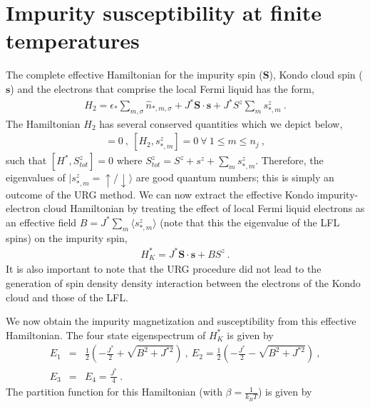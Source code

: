 \documentclass[aps,prb,preprint,groupedaddress]{revtex4-2}
\begin{document}
\section{Impurity susceptibility at finite temperatures}\label{susc1}
The complete effective Hamiltonian for the impurity spin ($\mathbf{S}$), Kondo cloud spin ($\mathbf{s}$) and the electrons that comprise the local Fermi liquid has the form,
\begin{eqnarray}
H_{2}=\epsilon_{*}\sum_{m,\sigma}\hat{n}_{*,m,\sigma}+J^{*}\mathbf{S}\cdot\mathbf{s}+J^{*}S^{z}\sum_{m}s^{z}_{*,m}~.
\label{kondototham}
\end{eqnarray}
The Hamiltonian $H_{2}$ has several conserved quantities which we depict below,
\begin{eqnarray}
[H_{2},S^{z}+s^{z}]=0~,~ [H_{2},s^{z}_{*,m}]=0 ~\forall ~1\leq m\leq n_{j}~,
\end{eqnarray}
such that $[H^{*},S^{z}_{tot}]=0$ where $S^{z}_{tot}=S^{z}+s^{z}+\sum_{m}s^{z}_{*,m}$. Therefore, the eigenvalues of $|s^{z}_{*,m}=\uparrow/\downarrow\rangle$  are good quantum numbers; this is simply an outcome of the URG method. We can now extract the effective Kondo impurity-electron cloud Hamiltonian by treating the effect of local Fermi liquid electrons as an effective field $B=J^{*}\sum_{m}\langle s^{z}_{*,m}\rangle$ (note that this the eigenvalue of the LFL spins) on the impurity spin,
\begin{eqnarray}
H^{*}_{K}=J^{*}\mathbf{S}\cdot\mathbf{s}+BS^{z}~.
\end{eqnarray}
It is also important to note that the URG procedure did not lead to the generation of spin density density interaction between the electrons of the Kondo cloud and those of the LFL.
\par\noindent
We now obtain the impurity magnetization and susceptibility from this effective Hamiltonian. The four state eigenspectrum of $H^{*}_{K}$ is given by
\begin{eqnarray}
E_{1}&=&\frac{1}{2}(-\frac{J^{*}}{2}+\sqrt{B^{2}+J^{*2}})~,~E_{2}=\frac{1}{2}(-\frac{J^{*}}{2}-\sqrt{B^{2}+J^{*2}})~,\nonumber\\
E_{3}&=&E_{4}=\frac{J^{*}}{4}~.
\end{eqnarray}
The partition function for this Hamiltonian (with $\beta=\frac{1}{k_{B}T}$) is given by
\end{document}
